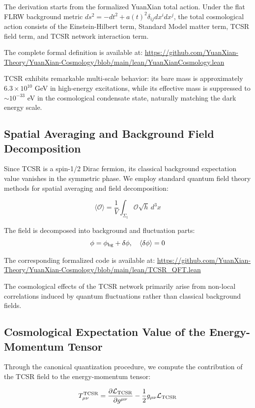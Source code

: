 \documentclass[12pt,a4paper]{article}
\begin{document}
The derivation starts from the formalized YuanXian total action. Under the flat FLRW background metric $ds^2 = -dt^2 + a(t)^2 \delta_{ij} dx^i dx^j$, the total cosmological action consists of the Einstein-Hilbert term, Standard Model matter term, TCSR field term, and TCSR network interaction term.

The complete formal definition is available at:
\url{https://github.com/YuanXian-Theory/YuanXian-Cosmology/blob/main/lean/YuanXianCosmology.lean}

TCSR exhibits remarkable multi-scale behavior: its bare mass is approximately $6.3 \times 10^{10}$ GeV in high-energy excitations, while its effective mass is suppressed to $\sim 10^{-33}$ eV in the cosmological condensate state, naturally matching the dark energy scale.

\subsection{Spatial Averaging and Background Field Decomposition}

Since TCSR is a spin-1/2 Dirac fermion, its classical background expectation value vanishes in the symmetric phase. We employ standard quantum field theory methods for spatial averaging and field decomposition:

\[
\langle \mathcal{O} \rangle = \frac{1}{V} \int_{\Sigma_t} \mathcal{O} \sqrt{h} \, d^3x
\]

The field is decomposed into background and fluctuation parts:
\[
\phi = \phi_{\rm bg} + \delta\phi, \quad \langle \delta\phi \rangle = 0
\]

The corresponding formalized code is available at:
\url{https://github.com/YuanXian-Theory/YuanXian-Cosmology/blob/main/lean/TCSR_QFT.lean}

The cosmological effects of the TCSR network primarily arise from non-local correlations induced by quantum fluctuations rather than classical background fields.

\subsection{Cosmological Expectation Value of the Energy-Momentum Tensor}

Through the canonical quantization procedure, we compute the contribution of the TCSR field to the energy-momentum tensor:

\[
T_{\mu\nu}^{\rm TCSR} = \frac{\partial \mathcal{L}_{\rm TCSR}}{\partial g^{\mu\nu}} - \frac{1}{2} g_{\mu\nu} \mathcal{L}_{\rm TCSR}
\]
\end{document}
